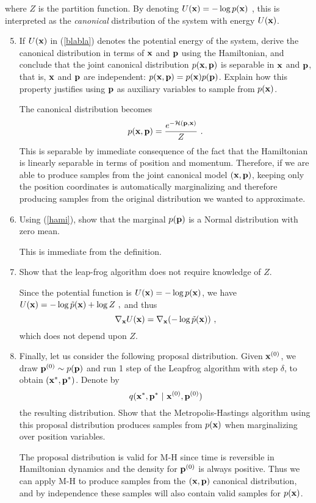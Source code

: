 \documentclass{article}
\newcommand{\xx}{{\bf x}}
\newcommand{\pp}{{\bf p}}
\begin{document}
 where $Z$ is the partition function. By denoting $U(\xx) = -\log p(\xx)$ , this is 
 interpreted as the \emph{canonical} distribution of the system with energy $U(\xx)$. 
\begin{enumerate}
\setcounter{enumi}{4}
\item If $U(\xx)$ in (\ref{blabla}) denotes the potential energy of the system, derive the canonical distribution in terms of $\xx$ and $\pp$ using the Hamiltonian, and conclude that the joint canonical distribution $p(\xx,\pp)$ is separable in $\xx$ and $\pp$, that is, $\xx$ and $\pp$ are independent: $p(\xx, \pp) = p(\xx) p(\pp)$. Explain how this property justifies using $\pp$ as auxiliary variables to sample from $p(\xx)$.

{\color{blue} 
The canonical distribution becomes
$$p(\xx, \pp) = \frac{e^{-\mathcal{H}(\pp,\xx)}}{Z}~.$$
This is separable by immediate consequence of the fact that the Hamiltonian is linearly separable in terms of position and momentum.
Therefore, if we are able to produce samples from the joint canonical model $(\xx, \pp)$, keeping only the position coordinates is automatically marginalizing and therefore producing samples from the original distribution we wanted to approximate.  
}
\item Using (\ref{hami}), show that the marginal $p(\pp)$ is a Normal distribution with zero mean.

{\color{blue} 
This is immediate from the definition. 
}
\item Show that the leap-frog algorithm does not require knowledge of $Z$.

{\color{blue} 
Since the potential function is $U(\xx)= - \log p(\xx)$, we have 
$U(\xx) = -\log \tilde{p}(\xx) + \log Z~,$ and thus 
$$\nabla_{\xx} U(\xx) = \nabla_{\xx} ( -\log \tilde{p}(\xx) )~,$$
which does not depend upon $Z$.
}
\item Finally, let us consider the following proposal distribution. Given $\xx^{(0)}$, we 
draw $\pp^{(0)} \sim p(\pp)$ and run 1 step of the Leapfrog algorithm with step $\delta$, to obtain
$( \xx^{*}, \pp^{*})$. Denote by   
\begin{equation}
q( \xx^*, \pp^* ~|~ \xx^{(0)}, \pp^{(0)}) 
\end{equation}
the resulting distribution. Show that the Metropolis-Hastings algorithm using this proposal distribution produces samples from $p(\xx)$ when marginalizing over position variables. 

{\color{blue} 
The proposal distribution is valid for M-H since time is reversible in Hamiltonian dynamics and the density for $\pp^{(0)}$ 
is always positive. Thus we can apply M-H to produce samples from the $(\xx, \pp)$ canonical distribution, and by independence 
these samples will also contain valid samples for $p(\xx)$. 
}
\end{enumerate}



%
%
\end{document}

